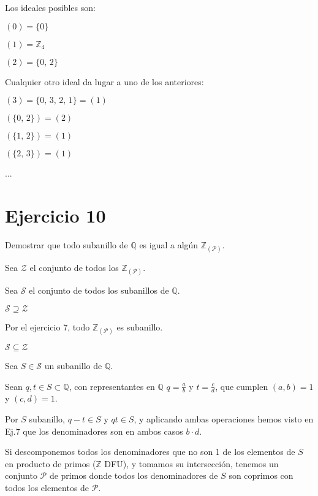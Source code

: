 \documentclass[10pt,a4paper]{article}
\begin{document}
	Los ideales posibles son:
	
	$(0) = \{0\} $
	
	$(1) = \mathbb{Z}_4 $
	
	$(2) = \{ 0,\, 2  \} $
	
	\hfil
	
	Cualquier otro ideal da lugar a uno de los anteriores:
	
	$(3) = \{ 0,\, 3,\, 2,\, 1 \} = (1) $
	
	$(\{0,\, 2 \}) = (2)$
	
	$(\{1,\, 2 \}) = (1)$
	
	$(\{2,\, 3 \}) = (1)$
	
	...
	
	
	
	\section*{Ejercicio 10}
	
	
	Demostrar que todo subanillo de $\mathbb{Q} $ es igual a algún $ \mathbb{Z}_{\left( \mathcal{P} \right)} $.
	
	\hfill
	
	Sea $\mathcal{Z}$ el conjunto de todos los $ \mathbb{Z}_{\left( \mathcal{P} \right)} $.
	
	Sea $\mathcal{S}$ el conjunto de todos los subanillos de $\mathbb{Q}$.
	
	\hfill
	
	$\mathcal{S} \supseteq \mathcal{Z}$
	
	Por el ejercicio 7, todo  $ \mathbb{Z}_{\left( \mathcal{P} \right)} $ es subanillo.
	
	
	
	
	\hfill
	
	$\mathcal{S} \subseteq \mathcal{Z}$
	
	Sea $S \in \mathcal{S}$ un subanillo de $\mathbb{Q}$.
	
	Sean $q, t \in S \subset \mathbb{Q}$, con representantes en $\mathbb{Q}$ $q= \frac{a}{b}$ y $t = \frac{c}{d}$, que cumplen $(a,b)=1$ y $(c,d)=1$.
	
	Por $S$ subanillo, $q-t\in S$ y $qt\in S$, y aplicando ambas operaciones hemos visto en Ej.7 que los denominadores son en ambos casos $b \cdot d$.
	
	Si descomponemos todos los denominadores que no son 1 de los elementos de $S$ en producto de primos ($\mathbb{Z}$ DFU), y tomamos su intersección, tenemos un conjunto $\mathcal{P}$ de primos donde todos los denominadores de $S$ son coprimos con todos los elementos de $\mathcal{P}$.
	
\end{document}
